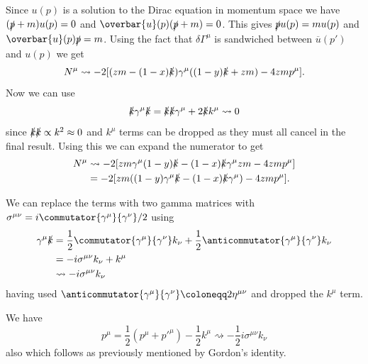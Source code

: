 \documentclass[fleqn]{NotesClass}
\newcommand{\diracadjoint}[1]{\overbar{#1}}
\newcommand{\minkowskiMetric}{\eta}
\begin{document}
    Since \(u(p)\) is a solution to the Dirac equation in momentum space we have \((\slashed{p} + m)u(p) = 0\) and \(\diracadjoint{u}(p)(\slashed{p} + m) = 0\).
    This gives \(\slashed{p}u(p) = mu(p)\) and \(\diracadjoint{u}(p)\slashed{p} = m\).
    Using the fact that \(\delta\Gamma^\mu\) is sandwiched between \(\diracadjoint{u}(p')\) and \(u(p)\) we get
    \begin{equation}
        N^\mu \rightsquigarrow -2[(zm - (1 - x)\slashed{k})\gamma^\mu((1 - y)\slashed{k} + zm) - 4zmp^\mu].
    \end{equation}
    Now we can use
    \begin{equation}
        \slashed{k} \gamma^\mu \slashed{k} = \slashed{k}\slashed{k}\gamma^\mu + 2\slashed{k}k^\mu \rightsquigarrow 0
    \end{equation}
    since \(\slashed{k}\slashed{k} \propto k^2 \approx 0\) and \(k^\mu\) terms can be dropped as they must all cancel in the final result.
    Using this we can expand the numerator to get
    \begin{align}
        N^\mu &\rightsquigarrow -2[zm\gamma^\mu(1 - y)\slashed{k} - (1 - x)\slashed{k}\gamma^\mu zm - 4zmp^\mu]\\
        &= -2[zm((1 - y)\gamma^\mu\slashed{k} - (1 - x)\slashed{k}\gamma^\mu) - 4zmp^\mu].
    \end{align}
    
    We can replace the terms with two gamma matrices with \(\sigma^{\mu\nu} = i\commutator{\gamma^\mu}{\gamma^\nu}/2\) using
    \begin{align}
        \gamma^\mu \slashed{k} &= \frac{1}{2}\commutator{\gamma^\mu}{\gamma^\nu}k_\nu + \frac{1}{2}\anticommutator{\gamma^\mu}{\gamma^\nu}k_\nu\\
        &= -i\sigma^{\mu\nu}k_\nu + k^\mu\\
        &\rightsquigarrow -i\sigma^{\mu\nu}k_\nu
    \end{align}
    having used \(\anticommutator{\gamma^\mu}{\gamma^\nu} \coloneqq 2\minkowskiMetric^{\mu\nu}\) and dropped the \(k^\mu\) term.
    
    We have
    \begin{equation}
        p^\mu = \frac{1}{2}(p^\mu + p'^\mu) - \frac{1}{2}k^\mu \rightsquigarrow -\frac{1}{2}i\sigma^{\mu\nu}k_\nu
    \end{equation}
    also which follows as previously mentioned by Gordon's identity.
    
\end{document}
